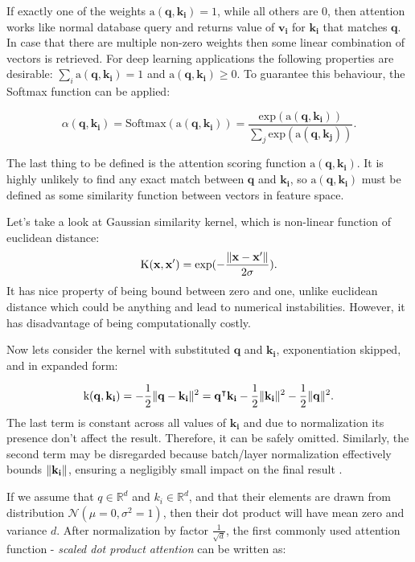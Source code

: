 If exactly one of the weights $\text{a}(\mathbf{q},\mathbf{k_i}) = 1$, while all others are $0$, then attention works like normal database query and returns value of $\mathbf{v_i}$ for $\mathbf{k_i}$ that matches $\mathbf{q}$.
In case that there are multiple non-zero weights then some linear combination of vectors is retrieved. 
For deep learning applications the following properties are desirable: $\sum_i \text{a}(\mathbf{q}, \mathbf{k_i}) = 1$ and $\text{a}(\mathbf{q}, \mathbf{k_i}) \ge 0$. To guarantee this behaviour, the Softmax function can be applied:

\[ \alpha(\mathbf{q}, \mathbf{k_i}) = \text{Softmax}(\text{a}(\mathbf{q}, \mathbf{k_i})) = \frac{\text{exp}(\text{a}(\mathbf{q}, \mathbf{k_i}))}{\sum_j \text{exp}(\text{a}(\mathbf{q}, \mathbf{k_j}))}.\]

The last thing to be defined is the attention scoring function $\text{a}(\mathbf{q}, \mathbf{k_i})$.
It is highly unlikely to find any exact match between $\mathbf{q}$ and $\mathbf{k_i}$, so $\text{a}(\mathbf{q}, \mathbf{k_i})$ must be defined as some similarity function between vectors in feature space.

Let's take a look at Gaussian similarity kernel, which is non-linear function of euclidean distance:
\[\text{K}(\mathbf{x}, \mathbf{x'}) = \text{exp}(-\frac{\Vert\mathbf{x} - \mathbf{x'}\Vert}{2\sigma}).\]
It has nice property of being bound between zero and one, unlike euclidean distance which could be anything and lead to numerical instabilities.
However, it has disadvantage of being computationally costly.

Now lets consider the kernel with substituted $\mathbf{q}$ and $\mathbf{k_i}$, exponentiation skipped, and in expanded form:

\[\text{k}(\mathbf{q}, \mathbf{k_i}) = -\frac{1}{2}\Vert\mathbf{q} - \mathbf{k_i}\Vert^2 = \mathbf{q}^\intercal \mathbf{k_i} - \frac{1}{2}\Vert\mathbf{k_i}\Vert^2 - \frac{1}{2}\Vert\mathbf{q}\Vert^2.\]
The last term is constant across all values of $\mathbf{k_i}$ and due to normalization its presence don't affect the result. 
Therefore, it can be safely omitted. 
Similarly, the second term may be disregarded because batch/layer normalization effectively bounds $\Vert\mathbf{k_i}\Vert$, ensuring a negligibly small impact on the final result \cite{d2lAttentionScoring}.

If we assume that $q \in \mathbb{R}^{d}$ and $k_i \in \mathbb{R}^d$, and that their elements are drawn from distribution $\mathcal{N}(\mu=0, \sigma^2=1)$, then their dot product will have mean zero and variance $d$.
After normalization by factor $\frac{1}{\sqrt{d}}$, the first commonly used attention function - \emph{scaled dot product attention} \cite{Vaswani2017} can be written as:

